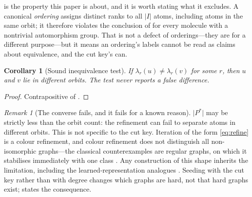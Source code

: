 \documentclass[11pt,twocolumn,a4paper]{article}
\theoremstyle{crthm}
\newtheorem{corollary}[theorem]{Corollary}
\theoremstyle{definition}
\theoremstyle{remark}
\newtheorem{remark}[theorem]{Remark}
\newcommand{\abs}[1]{\lvert#1\rvert}
\begin{document}
 is the property this paper is about, and it is
worth stating what it excludes. A canonical \emph{ordering} assigns
distinct ranks to all $\abs{I}$ atoms, including atoms in the same orbit;
it therefore violates the conclusion of  for every
molecule with a nontrivial automorphism group. That is not a defect of
orderings---they are for a different purpose---but it means an ordering's
labels cannot be read as claims about equivalence, and the cut key's can.

\begin{corollary}[Sound inequivalence test]
\label{cor:sound-test}
If $\lambda_r(u)\neq\lambda_r(v)$ for some $r$, then $u$ and $v$ lie in
different orbits. The test never reports a false difference.
\end{corollary}

\begin{proof}
Contrapositive of .
\end{proof}

\begin{remark}[The converse fails, and it fails for a known reason]
\label{rem:incomplete}
$\abs{P^{*}}$ may be strictly less than the orbit count: the refinement
can fail to separate atoms in different orbits. This is not specific to
the cut key. Iteration of the form \eqref{eq:refine} is a colour
refinement, and colour refinement does not distinguish all non-isomorphic
graphs---the classical counterexamples are regular graphs, on which it
stabilises immediately with one class \citep{cai1992,arvind2015}. Any
construction of this shape inherits the limitation, including the
learned-representation analogues \citep{xu2019}. Seeding with the cut key
rather than with degree changes which graphs are hard, not that hard
graphs exist;  states the consequence.
\end{remark}
\end{document}
